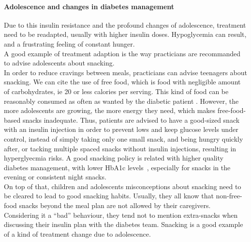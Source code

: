 \paragraph{Adolescence and changes in diabetes management}
Due to this insulin resistance and the profound changes of adolescence, treatment need to be readapted, usually with higher insulin doses. Hypoglycemia can result, and a frustrating feeling of constant hunger. \\A good example of treatment adaption is the way practicians are recommanded to advise adolescents about snacking. \\
In order to reduce cravings between meals, practicians can advise teenagers about snacking. We can cite the use of free food, which is food with negligible amount of carbohydrates, ie 20 or less calories per serving. This kind of food can be reasonably consumed as often as wanted by the diabetic patient \cite{tu1993assessment}. However, the more adolescents are growing, the more energy they need, which makes free-food-based snacks inadequate. Thus, patients are advised to have a good-sized snack with an insulin injection in order to prevent lows and keep glucose levels under control, instead of simply taking only one small snack, and being hungry quickly after, or tacking multiple spaced snacks without insulin injections, resulting in hyperglyecmia risks. A good snacking policy is related with higher quality diabetes management, with lower HbA1c levels~\cite{delahanty1993role}, especially for snacks in the evening or consistent night snacks.
\\
On top of that, children and adolescents misconceptions about snacking need to be cleared to lead to good snacking habits. Usually, they all know that non-free-food snacks beyond the meal plan are not allowed by their caregivers. Considering it a ``bad'' behaviour, they tend not to mention extra-snacks when discussing their insulin plan with the diabetes team. Snacking is a good example of a kind of treatment change due to adolescence.

